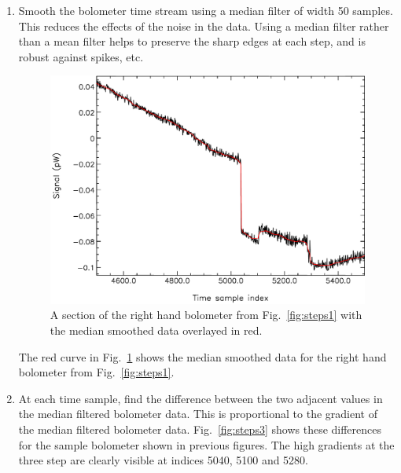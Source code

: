 \documentclass[useAMS,usenatbib,nofootinbib]{mn2e}
\begin{document}
\begin{enumerate}

\item Smooth the bolometer time stream using a median filter of width
50 samples. This reduces the effects of the noise in the data. Using a
median filter rather than a mean filter helps to preserve the sharp edges
at each step, and is robust against spikes, etc.

\begin{figure}
\centering
\includegraphics[width=\linewidth]{steps2.pdf}
\caption{A section of the right hand bolometer from  Fig.~\ref{fig:steps1}
with the median smoothed data overlayed in red.}
\label{fig:steps2}
\end{figure}

The red curve in Fig.~\ref{fig:steps2} shows the median smoothed data for
the right hand bolometer from Fig.~\ref{fig:steps1}.

\item At each time sample, find the difference between the two adjacent
values in the median filtered bolometer data. This is proportional to the
gradient of the median filtered bolometer data. Fig.~\ref{fig:steps3}
shows these differences for the sample bolometer shown in previous
figures. The high gradients at the three step are clearly visible at
indices 5040, 5100 and 5280.


\end{enumerate}
\end{document}
